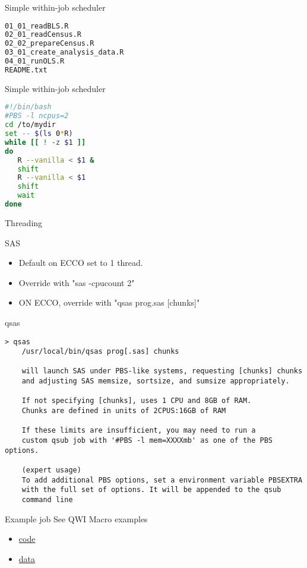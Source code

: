 \documentclass[xcolor=table,compress]{beamer}
\begin{document}
\begin{frame}[fragile]{Simple within-job scheduler}
\begin{lstlisting}[language=bash,numbers=none]
01_01_readBLS.R
02_01_readCensus.R
02_02_prepareCensus.R
03_01_create_analysis_data.R
04_01_runOLS.R
README.txt
\end{lstlisting}
\end{frame}

\begin{frame}[fragile]{Simple within-job scheduler}
\begin{lstlisting}[language=bash]
#!/bin/bash
#PBS -l ncpus=2
cd /to/mydir
set -- $(ls 0*R)
while [[ ! -z $1 ]] 
do
   R --vanilla < $1 &
   shift
   R --vanilla < $1 
   shift
   wait
done
\end{lstlisting}
\end{frame}


\begin{frame}{Threading}
\begin{block}{SAS}
\begin{itemize}
\item Default on ECCO set to 1 thread.
\item Override with "sas -cpucount 2"
\item ON ECCO, override with "qsas prog.sas [chunks]"
\end{itemize}\end{block}
\end{frame}


\begin{frame}[fragile]{qsas}
\begin{lstlisting}
> qsas
    /usr/local/bin/qsas prog[.sas] chunks

    will launch SAS under PBS-like systems, requesting [chunks] chunks
    and adjusting SAS memsize, sortsize, and sumsize appropriately.

    If not specifying [chunks], uses 1 CPU and 8GB of RAM.
    Chunks are defined in units of 2CPUS:16GB of RAM

    If these limits are insufficient, you may need to run a 
    custom qsub job with '#PBS -l mem=XXXXmb' as one of the PBS options.

    (expert usage)
    To add additional PBS options, set a environment variable PBSEXTRA
    with the full set of options. It will be appended to the qsub
    command line 
\end{lstlisting}
\end{frame}


\begin{frame}{Example job}
See QWI Macro examples
\begin{itemize}
\item 
\href{http://repository.vrdc.cornell.edu/private/jma7/qwi-macro.production/programs/}{code}
\item \href{http://www2.vrdc.cornell.edu/news/data/qwi-national-data/}{data}
\end{itemize}
\end{frame}
\end{document}
